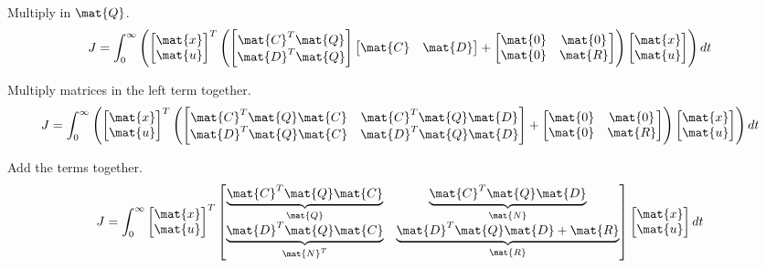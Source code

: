 Multiply in $\mat{Q}$.
\begin{equation*}
  J = \int_0^\infty \left(
    \begin{bmatrix}
      \mat{x} \\
      \mat{u}
    \end{bmatrix}^T
    \left(
    \begin{bmatrix}
      \mat{C}^T\mat{Q} \\
      \mat{D}^T\mat{Q}
    \end{bmatrix}
    \begin{bmatrix}
      \mat{C} &
      \mat{D}
    \end{bmatrix} +
    \begin{bmatrix}
      \mat{0} & \mat{0} \\
      \mat{0} & \mat{R}
    \end{bmatrix}
    \right)
    \begin{bmatrix}
      \mat{x} \\
      \mat{u}
    \end{bmatrix}
    \right) dt
\end{equation*}

Multiply matrices in the left term together.
\begin{equation*}
  J = \int_0^\infty \left(
    \begin{bmatrix}
      \mat{x} \\
      \mat{u}
    \end{bmatrix}^T
    \left(
    \begin{bmatrix}
      \mat{C}^T\mat{Q}\mat{C} & \mat{C}^T\mat{Q}\mat{D} \\
      \mat{D}^T\mat{Q}\mat{C} & \mat{D}^T\mat{Q}\mat{D}
    \end{bmatrix} +
    \begin{bmatrix}
      \mat{0} & \mat{0} \\
      \mat{0} & \mat{R}
    \end{bmatrix}
    \right)
    \begin{bmatrix}
      \mat{x} \\
      \mat{u}
    \end{bmatrix}
    \right) dt
\end{equation*}

Add the terms together.
\begin{equation}
  J = \int_0^\infty
  \begin{bmatrix}
    \mat{x} \\
    \mat{u}
  \end{bmatrix}^T
  \begin{bmatrix}
    \underbrace{\mat{C}^T\mat{Q}\mat{C}}_{\mat{Q}} &
    \underbrace{\mat{C}^T\mat{Q}\mat{D}}_{\mat{N}} \\
    \underbrace{\mat{D}^T\mat{Q}\mat{C}}_{\mat{N}^T} &
    \underbrace{\mat{D}^T\mat{Q}\mat{D} + \mat{R}}_{\mat{R}}
  \end{bmatrix}
  \begin{bmatrix}
    \mat{x} \\
    \mat{u}
  \end{bmatrix}
  dt
\end{equation}

